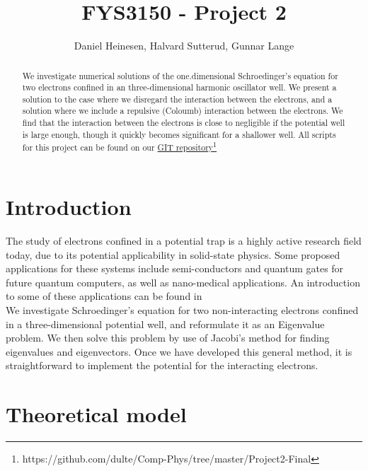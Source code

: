\documentclass[a4paper, 10pt]{article}
\title{FYS3150 - Project 2}
\author{Daniel Heinesen, Halvard Sutterud, Gunnar Lange}
\begin{document}
\maketitle
\begin{abstract}We investigate numerical solutions of the one.dimensional Schroedinger's equation for two electrons confined in an three-dimensional harmonic oscillator well. We present a solution to the case where we disregard the interaction between the electrons, and a solution where we include a repulsive (Coloumb) interaction between the electrons. We find that the interaction between the electrons is close to negligible if the potential well is large enough, though it quickly becomes significant for a shallower well. All scripts for this project can be found on our \href{https://github.com/dulte/Comp-Phys/tree/master/Project2-Final}{GIT repository}\footnote{https://github.com/dulte/Comp-Phys/tree/master/Project2-Final}
\end{abstract}

\tableofcontents
\newpage
\section{Introduction}
The study of electrons confined in a potential trap is a highly active research field today, due to its potential applicability in solid-state physics. Some proposed applications for these systems include semi-conductors and quantum gates for future quantum computers, as well as nano-medical applications. An introduction to some of these applications can be found in \cite{Quantum-Dots}\\
\linebreak
We investigate Schroedinger's equation for two non-interacting electrons confined in a three-dimensional potential well, and reformulate it as an Eigenvalue problem. We then solve this problem by use of Jacobi's method for finding eigenvalues and eigenvectors. Once we have developed this general method, it is straightforward to implement the potential for the interacting electrons.

\section{Theoretical model}\label{Theoretical_section}
\end{document}
